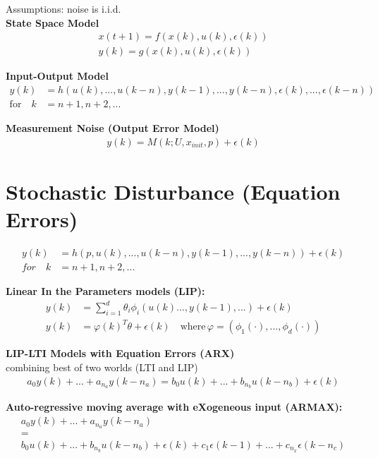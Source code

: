 \begin{tcolorbox}[colback=green!5!white,colframe=green!75!black,title=\textbf{Stochastic Model}]
	
	Assumptions:  noise is i.i.d.\\
	
	\textbf{State Space Model}
	\begin{align*}
	x(t+1) = f(x(k), u(k), \epsilon(k)) \\
	y(k) = g(x(k), u(k), \epsilon(k))
	\end{align*}
	
	\textbf{Input-Output Model}
	\begin{align*}
	y(k) &= h(u(k), ..., u(k-n), y(k-1), ..., y(k-n), \epsilon(k), ..., \epsilon(k-n))\\
	\text{for} \quad k &= n + 1, n + 2, ...
	\end{align*}	
	
	\textbf{Measurement Noise (Output Error Model)}
	\begin{align*}
	y(k) = M(k; U, x_{init}, p) + \epsilon(k)
	\end{align*}
	\tcblower
	\section*{Stochastic Disturbance (Equation Errors)}
	\begin{align*}
	y(k) &= h(p, u(k), ..., u(k-n), y(k-1), ..., y(k-n)) + \epsilon(k)\\
	for \quad k& = n + 1, n + 2, ...
	\end{align*}
	
	\textbf{Linear In the Parameters models (LIP):}
	\begin{align*}
	y(k) &= \sum_{ i = 1}^{d}\theta_i\phi_i(u(k)...,y(k-1),...)+\epsilon(k)\\
	y(k) &= \varphi(k)^T\theta + \epsilon(k) \quad \text{where} \, \varphi = (\phi_1(\cdot),... ,\phi_d(\cdot)) 
	\end{align*}

	\textbf{LIP-LTI Models with Equation Errors (ARX)}\\
	combining best of two worlds (LTI and LIP)
	\begin{align*}
	a_0y(k) + ...+a_{n_{a}}y(k-n_a) = b_0u(k) + ... + b_{n_{b}}u(k-n_b) + \epsilon(k)
	\end{align*}
	
	\textbf{Auto-regressive moving average with eXogeneous input (ARMAX):}
	\begin{align*}
	a_0y(k) + ... + a_{n_a}y(k-n_a)\\
	=\\
	b_0u(k) + ... + b_{n_b} u(k - n_b) + \epsilon(k) + c_1 \epsilon(k-1) + ... + c_{n_x} \epsilon(k-n_c)
	\end{align*}
	

\end{tcolorbox}

